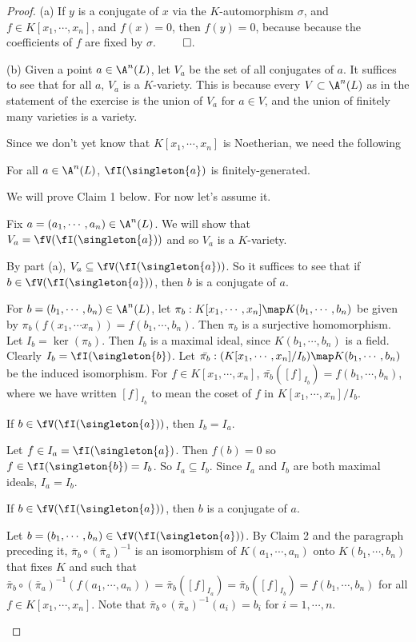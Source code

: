 \documentclass[oneside,12pt]{amsart}
\begin{document}
\begin{proof}
(a) If $y$ is a conjugate of $x$ via the $K$-automorphism $\sigma$, and $f\in K[x_1,\cdots,x_n]$,
and $f(x)=0$, then $f(y)=0$, because
because the coefficients of $f$ are fixed by $\sigma$. $\qed$.

(b) Given a point $a\in\A^n(L)$, let $V_a$ be the set of all conjugates of $a$. It suffices to see that
for all $a$, $V_a$ is a $K$-variety. This is because every $V\subset\A^n(L)$ as in the statement of the
exercise is the union of $V_a$ for $a\in V$, and the union of finitely many varieties is a variety.

Since we don't yet know that $K[x_1,\cdots,x_n]$ is Noetherian, we need the following

\begin{claim}[Claim 1]
For all $a\in\A^n(L)$, $\fI(\singleton{a})$ is finitely-generated. 
\end{claim}

We will prove Claim 1 below. For now let's assume it.

Fix $a=(a_1,\cdots,a_n)\in\A^n(L)$. We will show that $V_a = \fV(\fI(\singleton{a}))$
and so $V_a$ is a $K$-variety.


By part (a), $V_a\subseteq \fV(\fI(\singleton{a}))$.  So it suffices to see that if
$b\in\fV(\fI(\singleton{a}))$, then $b$ is a conjugate of $a$.

For $b=(b_1,\cdots,b_n)\in\A^n(L)$, let $\pi_b:K[x_1,\cdots,x_n]\map K(b_1,\cdots,b_n)$ be given by $\pi_b(f(x_1,\cdots x_n)) = f(b_1,\cdots,b_n)$.
Then $\pi_b$ is a surjective homomorphism. Let $I_b=\ker(\pi_b)$. Then $I_b$ is a maximal ideal,
since $K(b_1,\cdots,b_n)$ is a field. Clearly $I_b=\fI(\singleton{b})$.
Let 
$\bar{\pi_b}:(K[x_1,\cdots,x_n]/I_b)\map K(b_1,\cdots,b_n)$ be the induced isomorphism. 
For $f\in K[x_1,\cdots,x_n]$, $\bar{\pi_b}([f]_{I_b}) = f(b_1,\cdots,b_n)$, where we have written
$[f]_{I_b}$ to mean the coset of $f$ in $K[x_1,\cdots,x_n]/I_b$.

\begin{claim}[Claim 2]
If $b\in\fV(\fI(\singleton{a}))$, then $I_b=I_a$.
\end{claim}
\begin{subproof}
Let $f\in I_a = \fI(\singleton{a})$. Then $f(b)=0$ so $f\in\fI(\singleton{b})=I_b$.
So $I_a\subseteq I_b$. Since $I_a$ and $I_b$ are both maximal ideals, $I_a=I_b$.
\end{subproof}

\begin{claim}[Claim 3]
If $b\in\fV(\fI(\singleton{a}))$, then $b$ is a conjugate of $a$.
\end{claim}
\begin{subproof}
Let $b=(b_1,\cdots,b_n)\in\fV(\fI(\singleton{a}))$. 
By Claim 2 and the paragraph preceding it, $\bar{\pi}_b\circ (\bar{\pi}_a)^{-1}$ is an isomorphism of $K(a_1,\cdots,a_n)$
onto $K(b_1,\cdots,b_n)$ that fixes $K$ and such that 
$\bar{\pi}_b\circ (\bar{\pi}_a)^{-1}(f(a_1,\cdots,a_n))=\bar{\pi}_b([f]_{I_a})=\bar{\pi}_b([f]_{I_b}) =f(b_1,\cdots,b_n)$ for all $f\in K[x_1,\cdots,x_n]$.
Note that $\bar{\pi}_b\circ (\bar{\pi}_a)^{-1}(a_i)=b_i$ for $i=1,\cdots, n$.


\end{subproof}
\end{proof}
\end{document}
